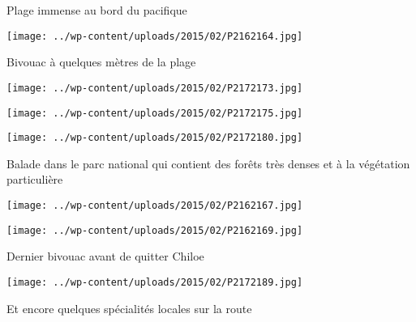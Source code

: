  Plage immense au bord du pacifique

 

\begin{center} \texttt{[image: ../wp-content/uploads/2015/02/P2162164.jpg]} \end{center}



 Bivouac à quelques mètres de la plage

 

\begin{center} \texttt{[image: ../wp-content/uploads/2015/02/P2172173.jpg]} \end{center}



 

\begin{center} \texttt{[image: ../wp-content/uploads/2015/02/P2172175.jpg]} \end{center}



 

\begin{center} \texttt{[image: ../wp-content/uploads/2015/02/P2172180.jpg]} \end{center}



 Balade dans le parc national qui contient des forêts très denses et à la végétation particulière

 

\begin{center} \texttt{[image: ../wp-content/uploads/2015/02/P2162167.jpg]} \end{center}



 

\begin{center} \texttt{[image: ../wp-content/uploads/2015/02/P2162169.jpg]} \end{center}



 Dernier bivouac avant de quitter Chiloe

 

\begin{center} \texttt{[image: ../wp-content/uploads/2015/02/P2172189.jpg]} \end{center}



 Et encore quelques spécialités locales sur la route

